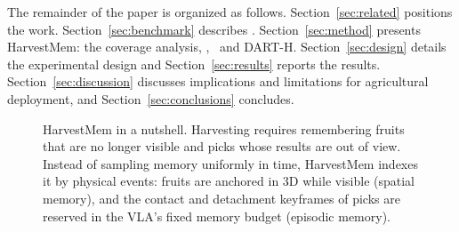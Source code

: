 The remainder of the paper is organized as follows. Section~\ref{sec:related} positions the work. Section~\ref{sec:benchmark} describes \bench. Section~\ref{sec:method} presents HarvestMem: the coverage analysis, \pekm, \fdm\ and DART-H. Section~\ref{sec:design} details the experimental design and Section~\ref{sec:results} reports the results. Section~\ref{sec:discussion} discusses implications and limitations for agricultural deployment, and Section~\ref{sec:conclusions} concludes.

\begin{figure}[t]
\centering
{}
\caption{HarvestMem in a nutshell. Harvesting requires remembering fruits that are no longer visible and picks whose results are out of view. Instead of sampling memory uniformly in time, HarvestMem indexes it by physical events: fruits are anchored in 3D while visible (spatial memory), and the contact and detachment keyframes of picks are reserved in the VLA's fixed memory budget (episodic memory).}
\label{fig:overview}
\end{figure}
